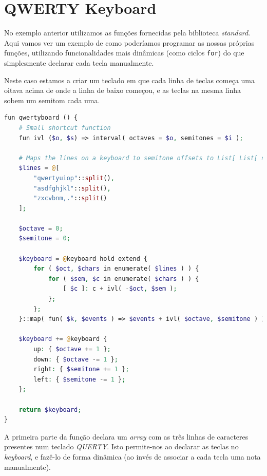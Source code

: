 \section{QWERTY Keyboard}
No exemplo anterior utilizamos as funções fornecidas pela biblioteca \textit{standard}. Aqui vamos ver um exemplo de como poderíamos programar as nossas próprias funções, utilizando funcionalidades mais dinâmicas (como ciclos \texttt{for}) do que simplesmente declarar cada tecla manualmente.

Neste caso estamos a criar um teclado em que cada linha de teclas começa uma oitava acima de onde a linha de baixo começou, e as teclas na mesma linha sobem um semitom cada uma.
\begin{lstlisting}[caption=Exemplo da sintaxe proposta da linguagem,language=PHP]
fun qwertyboard () {
    # Small shortcut function
    fun ivl ($o, $s) => interval( octaves = $o, semitones = $i );

    # Maps the lines on a keyboard to semitone offsets to List[ List[ str ] ]
    $lines = @[
        "qwertyuiop"::split(),
        "asdfghjkl"::split(),
        "zxcvbnm,."::split()
    ];
    
    $octave = 0;
    $semitone = 0;
    
    $keyboard = @keyboard hold extend {
        for ( $oct, $chars in enumerate( $lines ) ) {
            for ( $sem, $c in enumerate( $chars ) ) {
                [ $c ]: c + ivl( -$oct, $sem );
            };
        };
    }::map( fun( $k, $events ) => $events + ivl( $octave, $semitone ) );
    
    $keyboard += @keyboard {
        up: { $octave += 1 };
        down: { $octave -= 1 };
        right: { $semitone += 1 };
        left: { $semitone -= 1 };
    };
    
    return $keyboard;
}
\end{lstlisting}
A primeira parte da função declara um \textit{array} com as três linhas de caracteres presentes num teclado \textit{QUERTY}. Isto permite-nos ao declarar as teclas no \textit{keyboard}, e fazê-lo de forma dinâmica (ao invés de associar a cada tecla uma nota manualmente).

